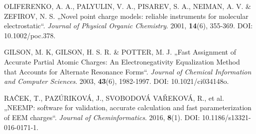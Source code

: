 \begin{thebibliography}{10}
OLIFERENKO, A. A., PALYULIN, V. A., PISAREV, S. A., NEIMAN, A. V. \& ZEFIROV, N. S. „Novel point charge models: reliable instruments for molecular electrostatic“. \textit{Journal of Physical Organic Chemistry}. 2001, \textbf{14}(6), 355-369. DOI: 10.1002/poc.378.

GILSON, M. K, GILSON, H. S. R. \& POTTER, M. J. „Fast Assignment of Accurate Partial Atomic Charges: An Electronegativity Equalization Method that Accounts for Alternate Resonance Forms“. \textit{Journal of Chemical Information and Computer Sciences}. 2003, \textbf{43}(6), 1982-1997. DOI: 10.1021/ci034148o.

RAČEK, T., PAZÚRIKOVÁ, J., SVOBODOVÁ VAŘEKOVÁ, R., et al. „NEEMP: software for validation, accurate calculation and fast parameterization of EEM charges“. \textit{Journal of Cheminformatics}. 2016, \textbf{8}(1). DOI: 10.1186/s13321-016-0171-1.

\end{thebibliography}


\cleardoublepage
